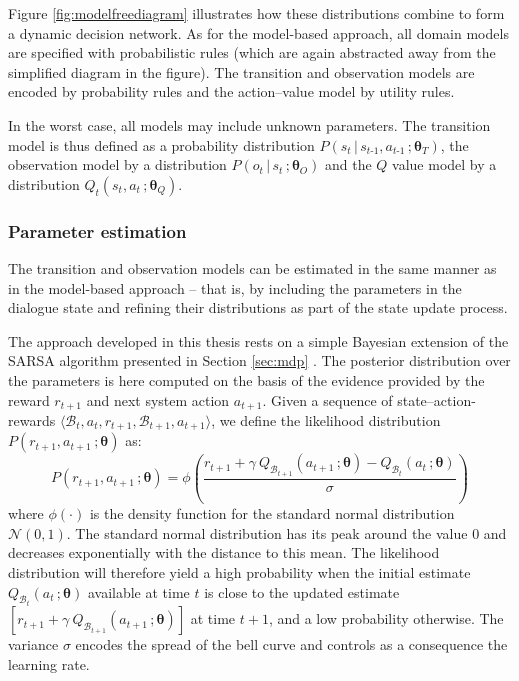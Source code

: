Figure \ref{fig:modelfreediagram} illustrates how these distributions combine to form a dynamic decision network. As for the model-based approach, all domain models are specified with probabilistic rules (which are again abstracted away from the simplified diagram in the figure). The transition and observation models are encoded by probability rules and the action--value model by utility rules. 

In the worst case, all models may include unknown parameters.  The transition model is thus defined as a probability distribution $P(s_t \, | \, s_{t\mbox{-}1}, a_{t\mbox{-}1} \,; \boldsymbol\theta_T)$, the observation model by a distribution $P(o_t \, | \, s_t\,; \boldsymbol\theta_O)$ and the $Q$ value model by a distribution $Q_t(s_t,a_t\,; \boldsymbol\theta_Q)$.  

\subsubsection*{Parameter estimation}

The transition and observation models can be estimated in the same manner as in the model-based approach -- that is, by including the parameters in the dialogue state and refining their distributions as part of the state update process. 

The approach developed in this thesis rests on a simple Bayesian extension of the SARSA algorithm presented in Section \ref{sec:mdp} .  The posterior distribution over the parameters is here computed on the basis of the evidence provided by the reward $r_{t+1}$ and next system action $a_{t+1}$.  Given a sequence of state--action-rewards $\langle \mathcal{B}_t, a_t, r_{t+1}, \mathcal{B}_{t+1}, a_{t+1} \rangle$, we define the likelihood distribution $P(r_{t+1}, a_{t+1} \,; \boldsymbol\theta)$ as:
\begin{equation}
P(r_{t+1}, a_{t+1} \,; \boldsymbol\theta) = \phi \left(\frac{r_{t+1} + \gamma \ Q_{\mathcal{B}_{t+1}} \left(a_{t+1} \,; \boldsymbol\theta\right) - Q_{\mathcal{B}_t}\left(a_t \,; \boldsymbol\theta\right)}{\sigma} \right) \label{eq:modelfreelikelihood}
\end{equation}
where $\phi(\cdot)$ is the density function for the standard normal distribution $\mathcal{N}(0, 1)$. The standard normal distribution has its peak around the value 0 and decreases exponentially with the distance to this mean. The likelihood distribution will therefore yield a high probability when the initial estimate 
$Q_{\mathcal{B}_t}(a_t \,; \boldsymbol\theta)$ available at time $t$ is close to the updated estimate $\left[r_{t+1} + \gamma \ Q_{\mathcal{B}_{t+1}} (a_{t+1} \,; \boldsymbol\theta) \right]$ at time $t+1$, and a low probability otherwise. The variance $\sigma$ encodes the spread of the bell curve and controls as a consequence the learning rate.

